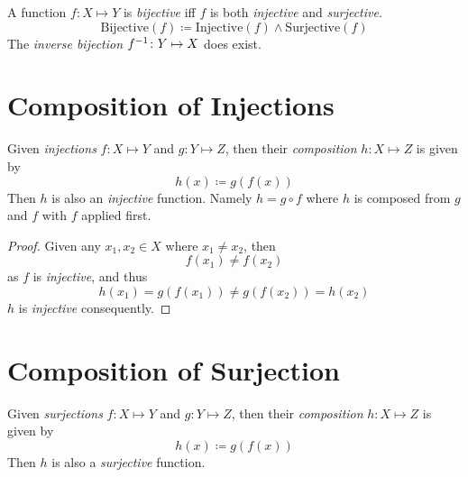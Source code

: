 \begin{definition}[Bijection]
    A function $f \colon X \mapsto Y$ is \textit{bijective} iff $f$ is both \textit{injective} and \textit{surjective}.
    \begin{equation}
        \mathrm{Bijective}(f) \coloneqq \mathrm{Injective}(f) \land \mathrm{Surjective}(f)
    \end{equation}
    The \textit{inverse bijection} ${f}^{-1} \colon Y \mapsto X$ does exist.
\end{definition}

\section{Composition of Injections}
\begin{proposition}
    Given \textit{injections} $f \colon X \mapsto Y$ and $g \colon Y \mapsto Z$, then their \textit{composition} $h \colon X \mapsto Z$ is given by
    \begin{equation}
        h(x) \coloneqq g(f(x))
    \end{equation}
    Then $h$ is also an \textit{injective} function. Namely $h = g \circ f$ where $h$ is composed from $g$ and $f$ with $f$ applied first.
\end{proposition}

\begin{proof}
    Given any $x_1, x_2 \in X$ where $x_1 \neq x_2$, then
    \begin{equation}
        f(x_1) \ne f(x_2)
    \end{equation}
    as $f$ is \textit{injective}, and thus
    \begin{equation}
        h(x_1) = g(f(x_1)) \neq g(f(x_2)) = h(x_2)
    \end{equation}
    $h$ is \textit{injective} consequently.
\end{proof}

\section{Composition of Surjection}
\begin{proposition}
    Given \textit{surjections} $f \colon X \mapsto Y$ and $g \colon Y \mapsto Z$, then their \textit{composition} $h \colon X \mapsto Z$ is given by
    \begin{equation}
        h(x) \coloneqq g(f(x))
    \end{equation}
    Then $h$ is also a \textit{surjective} function.
\end{proposition}

